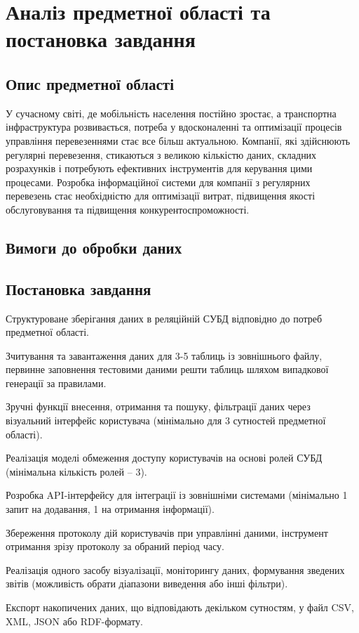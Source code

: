 \documentclass[oneside,14pt]{extarticle}
\begin{document}
\section{Аналіз предметної області та постановка завдання}
\subsection{Опис предметної області}
У сучасному світі, де мобільність населення постійно зростає, а транспортна інфраструктура розвивається, потреба у вдосконаленні та оптимізації процесів управління перевезеннями стає все більш актуальною. Компанії, які здійснюють регулярні перевезення, стикаються з великою кількістю даних, складних розрахунків і потребують ефективних інструментів для керування цими процесами. Розробка інформаційної системи для компанії з регулярних перевезень стає необхідністю для оптимізації витрат, підвищення якості обслуговування та підвищення конкурентоспроможності.

\subsection{Вимоги до обробки даних}

\subsection{Постановка завдання}
\begin{list}{•}{Функції інформаційної системи:}
    \item Структуроване зберігання даних в реляційній СУБД відповідно до потреб предметної області.
    \item Зчитування та завантаження даних для 3-5 таблиць із зовнішнього файлу, первинне заповнення тестовими даними решти таблиць шляхом випадкової генерації за правилами.
    \item Зручні функції внесення, отримання та пошуку, фільтрації даних через візуальний інтерфейс користувача (мінімально для 3 сутностей предметної області).
    \item Реалізація моделі обмеження доступу користувачів на основі ролей СУБД (мінімальна кількість ролей – 3).
    \item Розробка API-інтерфейсу для інтеграції із зовнішніми системами (мінімально 1 запит на додавання, 1 на отримання інформації).
    \item Збереження протоколу дій користувачів при управлінні даними, інструмент отримання зрізу протоколу за обраний період часу.
    \item Реалізація одного засобу візуалізації, моніторингу даних, формування зведених звітів (можливість обрати діапазони виведення або інші фільтри).
    \item Експорт накопичених даних, що відповідають декільком сутностям, у файл CSV, XML, JSON або RDF-формату.
\end{list}
\newpage
\end{document}
